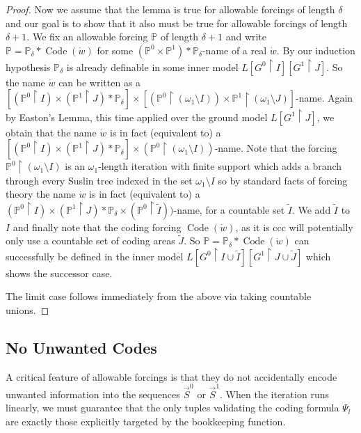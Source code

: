 \documentclass{article}
\theoremstyle{plain}
\theoremstyle{definition}
\newcommand{\forceP}{\mathbb{P}}
\begin{document}
\begin{proof}
    Now we assume that the lemma is true for allowable forcings of length $\delta$ and our goal is to show that it also must be true for allowable forcings of length $\delta+1$.
    We fix an allowable forcing $\forceP$ of length $\delta+1$ and write $\forceP= \forceP_{\delta} \ast \operatorname{Code} (\dot{w})$ for some $(\forceP^0 \times \forceP^1)\ast \forceP_{\delta}$-name of a real $\dot{w}$. By our induction hypothesis $\forceP_{\delta}$ is already definable in some inner model $L[G^0 \upharpoonright I] [G^1 \upharpoonright J]$. So the name $\dot{w}$ can be written as a $[(\forceP^0 \upharpoonright I) \times (\forceP^1 \upharpoonright J) \ast \forceP_{\delta}] \times [(\forceP^0 \upharpoonright (\omega_1 \setminus I)) \times \forceP^1 \upharpoonright (\omega_1 \setminus J)]$-name. Again by Easton's Lemma, this time applied over the ground model $L[G^1 \upharpoonright J]$, we obtain that the name $\dot{w}$ is in fact (equivalent to) a   $[(\forceP^0 \upharpoonright I) \times (\forceP^1 \upharpoonright J) \ast \forceP_{\delta}] \times (\forceP^0 \upharpoonright (\omega_1 \setminus I))$-name. Note that the forcing $\forceP^0 \upharpoonright (\omega_1 \setminus I)$ is an $\omega_1$-length iteration with finite support which adds a branch through every Suslin tree indexed in the set $\omega_1 \setminus I$ so by standard facts of forcing theory the name $\dot{w}$ is in fact (equivalent to) a $(\forceP^0 \upharpoonright I) \times (\forceP^1 \upharpoonright J) \ast \forceP_{\delta} \times (\forceP^0 \upharpoonright \tilde{I}))$-name, for a countable set $\tilde{I}$. We add $\tilde{I}$ to $I$ and finally note that the coding forcing $\operatorname{Code}(\dot{w})$, as it is ccc will potentially only use a countable set of coding areas $\tilde{J}$. So $\forceP= \forceP_{\delta} \ast \operatorname{Code} (\dot{w})$ can successfully be defined in the inner model
    $L[G^0 \upharpoonright I \cup \tilde{I}][G^1 \upharpoonright J \cup \tilde{J}]$ which shows the successor case.

    The limit case follows immediately from the above via taking countable unions. 
    \end{proof}


\subsection{No Unwanted Codes}

A critical feature of allowable forcings is that they do not accidentally encode unwanted information into the sequences $\vec{S}^0$ or $\vec{S}^1$. When the iteration runs linearly, we must guarantee that the only tuples validating the coding formula $\Psi_l$ are exactly those explicitly targeted by the bookkeeping function.
\end{document}
